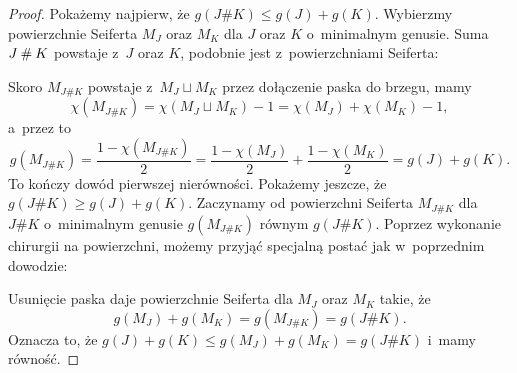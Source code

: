 \begin{proof}
    Pokażemy najpierw, że $g(J \# K) \le g(J) + g(K)$.
    Wybierzmy powierzchnie Seiferta $M_J$ oraz $M_K$ dla $J$ oraz $K$ o~minimalnym genusie.
    Suma $J \mathbin{\#} K$ powstaje z~$J$ oraz $K$, podobnie jest z~powierzchniami Seiferta:
\begin{comment}
    \begin{figure}[H]
        \centering
        \begin{minipage}[b]{.48\linewidth}
        \[
            \LargeGenusProofA \longrightarrow \LargeGenusProofB
        \]
        \subcaption{suma węzłów}
        \end{minipage}
        \begin{minipage}[b]{.48\linewidth}
        \[
            \LargeGenusProofC \longrightarrow \LargeGenusProofD
        \]
        \subcaption{suma powierzchni}
        \end{minipage}
    \end{figure}
\end{comment}

    Skoro $M_{J\#K}$ powstaje z~$M_J \sqcup M_K$ przez dołączenie paska do brzegu, mamy
    \begin{equation}
        \chi(M_{J\#K}) = \chi(M_J \sqcup M_K) - 1 = \chi(M_J) + \chi(M_K)-1,
    \end{equation}
    a~przez to
    \begin{equation}
        g(M_{J\#K}) = \frac{1-\chi(M_{J\#K})}{2} =
        \frac{1-\chi(M_{J})}{2} + \frac{1-\chi(M_{K})}{2}
        = g(J) + g(K).
    \end{equation}
    To kończy dowód pierwszej nierówności.
    Pokażemy jeszcze, że $g(J \# K) \ge g(J)+g(K)$.
    Zaczynamy od powierzchni Seiferta $M_{J\#K}$ dla $J\#K$ o~minimalnym genusie $g(M_{J\#K})$ równym $g(J\#K)$.
    Poprzez wykonanie chirurgii na powierzchni, możemy przyjąć specjalną postać jak w~poprzednim dowodzie:
\begin{comment}
    \[
        \LargeGenusProofD
    \]
\end{comment}

    Usunięcie paska daje powierzchnie Seiferta dla $M_J$ oraz $M_K$ takie, że
    \begin{equation}
        g(M_J)+g(M_K)=g(M_{J\#K})=g(J\#K).
    \end{equation}
    Oznacza to, że $g(J) + g(K) \le g(M_J) + g(M_K) = g(J\#K)$ i~mamy równość.
\end{proof}

